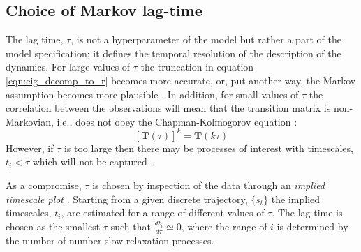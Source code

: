 \subsection{Choice of Markov lag-time}
The lag time, $\tau$, is not a hyperparameter of the model but rather a part of the model specification; it defines the temporal resolution of the description of the dynamics. For large values of $\tau$ the truncation in equation \ref{eqn:eig_decomp_to_r} becomes more accurate, or, put another way, the Markov assumption becomes more plausible \cite{prinzMarkovModelsMolecular2011}. In addition, for small values of $\tau$ the correlation between the observations will mean that the transition matrix is non-Markovian, i.e., does not obey the Chapman-Kolmogorov equation \cite{wasserman2013all}:
\begin{equation}\label{eqn:ck_eqn}
[\mathbf{T}(\tau)]^{k} = \mathbf{T}(k \tau)
\end{equation}
However, if $\tau$ is too large then there may be processes of interest with timescales, $t_{i}<\tau$ which will not be captured \cite{prinzMarkovModelsMolecular2011}.

As a compromise, $\tau$ is chosen by inspection of the data through an \emph{implied timescale plot} \cite{prinzMarkovModelsMolecular2011,swopeDescribingProteinFolding2004a}. Starting from a given discrete trajectory, $\{s_{t}\}$ the implied timescales, $t_{i}$, are estimated for a range of different values of $\tau$. The lag time is chosen as the smallest $\tau$ such that $\frac{d t_{i}}{d \tau} \simeq 0$, where the range of $i$ is determined by the number of number slow relaxation processes. 

